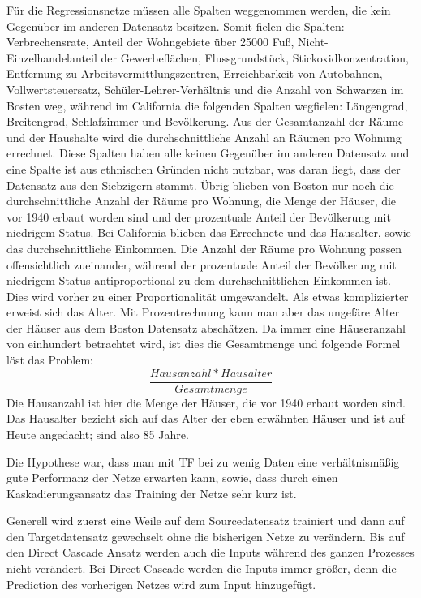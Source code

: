 Für die Regressionsnetze müssen alle Spalten weggenommen werden, die kein Gegenüber im anderen Datensatz besitzen. 
Somit fielen die Spalten: Verbrechensrate, Anteil der Wohngebiete über 25000 Fuß, Nicht-Einzelhandelanteil der Gewerbeflächen, 
Flussgrundstück, Stickoxidkonzentration, Entfernung zu Arbeitsvermittlungszentren, Erreichbarkeit von Autobahnen, 
Vollwertsteuersatz, Schüler-Lehrer-Verhältnis und die Anzahl von Schwarzen im Bosten weg, während im California die 
folgenden Spalten wegfielen: Längengrad, Breitengrad, Schlafzimmer und Bevölkerung. Aus der Gesamtanzahl der Räume und der Haushalte 
wird die durchschnittliche Anzahl an Räumen pro Wohnung errechnet.
Diese Spalten haben alle keinen Gegenüber im anderen Datensatz und eine Spalte ist aus ethnischen Gründen nicht nutzbar, was daran liegt, 
dass der Datensatz aus den Siebzigern stammt.
Übrig blieben von Boston nur noch die durchschnittliche Anzahl der Räume pro Wohnung, die Menge der Häuser, die vor 1940 
erbaut worden sind und der prozentuale Anteil der Bevölkerung mit niedrigem Status.
Bei California blieben das Errechnete und das Hausalter, sowie das durchschnittliche Einkommen. 
Die Anzahl der Räume pro Wohnung passen offensichtlich zueinander, während der prozentuale Anteil der Bevölkerung mit niedrigem Status 
antiproportional zu dem durchschnittlichen Einkommen ist. Dies wird vorher zu einer Proportionalität umgewandelt.
Als etwas komplizierter erweist sich das Alter. Mit Prozentrechnung kann man aber das ungefäre Alter der Häuser aus dem 
Boston Datensatz abschätzen. Da immer eine Häuseranzahl von einhundert betrachtet wird, ist dies die Gesamtmenge und folgende Formel 
löst das Problem: 
\begin{equation}
    \frac{Hausanzahl * Hausalter}{Gesamtmenge}
\end{equation}
Die Hausanzahl ist hier die Menge der Häuser, die vor 1940 erbaut worden sind. Das Hausalter bezieht sich auf das Alter der eben 
erwähnten Häuser und ist auf Heute angedacht; sind also 85 Jahre.

Die Hypothese war, dass man mit TF bei zu wenig Daten eine verhältnismäßig gute Performanz der Netze erwarten kann, sowie, 
dass durch einen Kaskadierungsansatz das Training der Netze sehr kurz ist.

Generell wird zuerst eine Weile auf dem Sourcedatensatz trainiert und dann auf den Targetdatensatz gewechselt ohne die 
bisherigen Netze zu verändern. Bis auf den Direct Cascade Ansatz werden auch die Inputs während des ganzen Prozesses nicht 
verändert.
Bei Direct Cascade werden die Inputs immer größer, denn die Prediction des vorherigen Netzes wird zum Input hinzugefügt.
